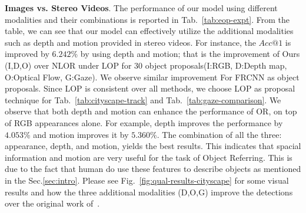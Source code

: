 \documentclass[10pt,twocolumn,letterpaper]{article}
\begin{document}

\bigskip
\noindent
\textbf{Images vs. Stereo Videos}.
The performance of our model using different modalities and their combinations is reported in Tab.~\ref{tab:eop-expt}. From the table, we can see that our model can effectively utilize the additional modalities such as depth and motion provided in stereo videos.  
For instance, the $Acc@1$ is improved by $6.242$\% by using depth and motion; that is the improvement of Ours (I,D,O) over NLOR under LOP for 30 object proposals(I:RGB, D:Depth map, O:Optical Flow, G:Gaze). 
We observe similar improvement For FRCNN as object proposals. Since LOP is consistent over all methods, we choose LOP as proposal technique for Tab.~\ref{tab:cityscape-track} and Tab.~\ref{tab:gaze-comparison}. We observe that both depth and motion can enhance the performance of OR, on top of RGB appearances alone. For example, depth improves the performance by $4.053$\% and motion improves it by $5.360$\%. The combination of all the three: appearance, depth, and motion, yields the best results. This indicates that spacial information and motion are very useful for the task of Object Referring. This is due to the fact that human do use these features to describe objects as mentioned in the Sec.\ref{sec:intro}. Please see Fig.~\ref{fig:qual-results-cityscape} for some visual results and how the three additional modalities (D,O,G) improve the detections over the original work of~\cite{hu2016natural}. 

\end{document}
